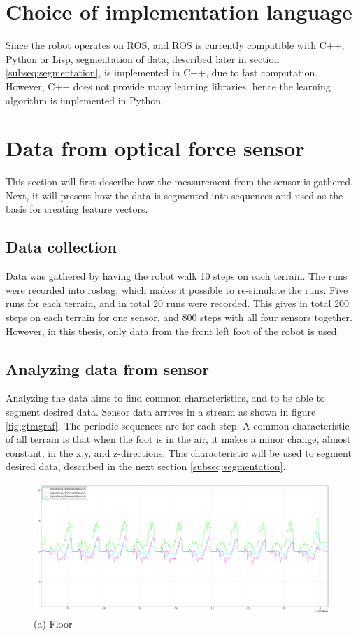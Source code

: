 \documentclass[USenglish]{ifimaster}  %
\begin{document}
\section{Choice of implementation language}
Since the robot operates on ROS, and ROS is currently compatible with C++, Python or Lisp, segmentation of data, described later in section \ref{subseq:segmentation}, is implemented in C++, due to fast computation. However, C++ does not provide many learning libraries, hence the learning algorithm is implemented in Python. 
			
\section{Data from optical force sensor}
This section will first describe how the measurement from the sensor is gathered. Next, it will present how the data is segmented into sequences and used as the basis for creating feature vectors.
	
\subsection{Data collection}
Data was gathered by having the robot walk 10 steps on each terrain. The runs were recorded into rosbag, which makes it possible to re-simulate the runs. Five runs for each terrain, and in total 20 runs were recorded. This gives in total 200 steps on each terrain for one sensor, and 800 steps with all four sensors together. However, in this thesis, only data from the front left foot of the robot is used.
	
\subsection{Analyzing data from sensor}\label{sec:analyzopto}
Analyzing the data aims to find common characteristics, and to be able to segment desired data. Sensor data arrives in a stream as shown in figure \ref{fig:gtmgraf}. The periodic sequences are for each step. A common characteristic of all terrain is that when the foot is in the air, it makes a minor change, almost constant, in the x,y, and z-directions. This characteristic will be used to segment desired data, described in the next section \ref{subseq:segmentation}.


\begin{figure}[h]
	\centering
	\includegraphics[width=\textwidth,height=\textheight,keepaspectratio]{Figures/gulvgraf}
	\captionsetup{labelformat=empty}
	\caption{(a) Floor}
	\label{fig:gulvgraf}
\end{figure}
\end{document}
